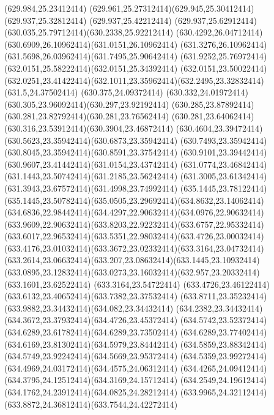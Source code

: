 {{	\lineto(629.984,25.23412414)
	\curveto(629.961,25.27312414)(629.945,25.30412414)(629.937,25.32812414)
	\lineto(629.937,25.42212414)
	\curveto(629.937,25.62912414)(630.035,25.79712414)(630.2338,25.92212414)
	\curveto(630.4292,26.04712414)(630.6909,26.10962414)(631.0151,26.10962414)
	\curveto(631.3276,26.10962414)(631.5698,26.03962414)(631.7495,25.90642414)
	\curveto(631.9252,25.76972414)(632.0151,25.58222414)(632.0151,25.34392414)
	\lineto(632.0151,23.50022414)
	\curveto(632.0251,23.41422414)(632.1011,23.35962414)(632.2495,23.32832414)
	\closepath
	\moveto(631.5,24.37502414)
	\lineto(630.375,24.09372414)
	\curveto(630.332,24.01972414)(630.305,23.96092414)(630.297,23.92192414)
	\curveto(630.285,23.87892414)(630.281,23.82792414)(630.281,23.76562414)
	\curveto(630.281,23.64062414)(630.316,23.53912414)(630.3904,23.46872414)
	\curveto(630.4604,23.39472414)(630.5623,23.35942414)(630.6873,23.35942414)
	\curveto(630.7493,23.35942414)(630.8045,23.35942414)(630.8591,23.37542414)
	\curveto(630.9101,23.39442414)(630.9607,23.41442414)(631.0154,23.43742414)
	\curveto(631.0774,23.46842414)(631.1443,23.50742414)(631.2185,23.56242414)
	\curveto(631.3005,23.61342414)(631.3943,23.67572414)(631.4998,23.74992414)
	\closepath
	\moveto(635.1445,23.78122414)
	\curveto(635.1445,23.50782414)(635.0505,23.29692414)(634.8632,23.14062414)
	\curveto(634.6836,22.98442414)(634.4297,22.90632414)(634.0976,22.90632414)
	\curveto(633.9609,22.90632414)(633.8203,22.92232414)(633.6757,22.95332414)
	\curveto(633.6017,22.96532414)(633.5351,22.98032414)(633.4726,23.00032414)
	\curveto(633.4176,23.01032414)(633.3672,23.02332414)(633.3164,23.04732414)
	\curveto(633.2614,23.06632414)(633.207,23.08632414)(633.1445,23.10932414)
	\curveto(633.0895,23.12832414)(633.0273,23.16032414)(632.957,23.20332414)
	\lineto(633.1601,23.62522414)
	\lineto(633.3164,23.54722414)
	\curveto(633.4726,23.46122414)(633.6132,23.40652414)(633.7382,23.37532414)
	\curveto(633.8711,23.35232414)(633.9882,23.34432414)(634.082,23.34432414)
	\curveto(634.2382,23.34432414)(634.3672,23.37932414)(634.4726,23.45372414)
	\curveto(634.5742,23.52372414)(634.6289,23.61782414)(634.6289,23.73502414)
	\curveto(634.6289,23.77402414)(634.6169,23.81302414)(634.5979,23.84442414)
	\curveto(634.5859,23.88342414)(634.5749,23.92242414)(634.5669,23.95372414)
	\curveto(634.5359,23.99272414)(634.4969,24.03172414)(634.4575,24.06312414)
	\curveto(634.4265,24.09412414)(634.3795,24.12512414)(634.3169,24.15712414)
	\curveto(634.2549,24.19612414)(634.1762,24.23912414)(634.0825,24.28212414)
	\curveto(633.9965,24.32112414)(633.8872,24.36812414)(633.7544,24.42272414)
}}
